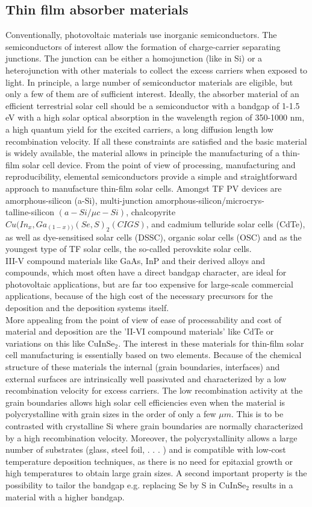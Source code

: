 \subsection{Thin film absorber materials}
Conventionally, photovoltaic materials use inorganic semiconductors. The semiconductors of interest allow the formation of charge-carrier separating junctions. The junction can be either a homojunction (like in Si) or a heterojunction with other materials to collect the excess carriers when exposed to light. In principle, a large number of semiconductor materials are eligible, but only a few of them are of sufficient interest. Ideally, the absorber material of an
efficient terrestrial solar cell should be a semiconductor with a bandgap of 1-1.5 eV with a high
solar optical absorption in the wavelength region of 350-1000 nm, a high
quantum yield for the excited carriers, a long diffusion length low recombination velocity. If
all these constraints are satisfied and the basic material is widely available, the material allows
in principle the manufacturing of a thin-film solar cell device.
From the point of view of processing, manufacturing and reproducibility, elemental semiconductors
provide a simple and straightforward approach to manufacture thin-film solar cells.
Amongst TF PV devices are amorphous-silicon (a-Si), multi-junction amorphous-silicon/microcrys-\\talline-silicon $(a-Si/\mu c-Si)$, chalcopyrite $Cu(In_x,Ga_{(1-x))} (Se,S)_2 (CIGS)$, and cadmium telluride solar cells (CdTe), as well as dye-sensitised solar cells (DSSC), organic solar cells (OSC) and as the youngest type of TF solar cells, the so-called perovskite solar cells.\\
III-V compound materials like GaAs, InP and their derived alloys and compounds, which
most often have a direct bandgap character, are ideal for photovoltaic applications, but are far too
expensive for large-scale commercial applications, because of the high cost of the necessary precursors for the deposition and the deposition systems itself. \\
More appealing from the point of view of ease of processability and cost of material and
deposition are the 'II-VI compound materials' like CdTe or variations on this like CuInSe$_2$. The interest in these materials for thin-film solar cell manufacturing is essentially based on two elements. Because of the chemical structure of these materials the internal (grain boundaries,
interfaces) and external surfaces are intrinsically well passivated and characterized by a low recombination velocity for excess carriers. The low recombination activity at the grain boundaries allows high solar cell efficiencies even when the material is polycrystalline with grain sizes in the order of only a few $\mu m$. This is to be contrasted with crystalline Si where grain boundaries are normally characterized by a high recombination velocity. Moreover, the polycrystallinity allows a large number of substrates (glass, steel foil, . . . ) and is compatible with low-cost temperature deposition techniques, as there is no need for epitaxial growth or high temperatures to obtain large grain sizes. A second important property is the possibility to tailor the bandgap e.g. replacing Se by S in CuInSe$_2$ results in a material with a higher bandgap.
